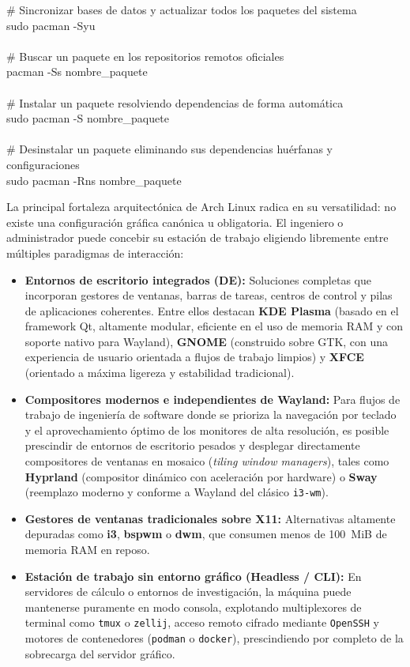 \documentclass[12pt]{article}
\begin{document}
\begin{mdframed}[style=terminal]
\ttfamily\upshape\color{bashLetterColor}\footnotesize
\# Sincronizar bases de datos y actualizar todos los paquetes del sistema \\
sudo pacman -Syu \\
\\
\# Buscar un paquete en los repositorios remotos oficiales \\
pacman -Ss nombre\_paquete \\
\\
\# Instalar un paquete resolviendo dependencias de forma automática \\
sudo pacman -S nombre\_paquete \\
\\
\# Desinstalar un paquete eliminando sus dependencias huérfanas y configuraciones \\
sudo pacman -Rns nombre\_paquete
\end{mdframed}

La principal fortaleza arquitectónica de Arch Linux radica en su versatilidad: no existe una configuración gráfica canónica u obligatoria. El ingeniero o administrador puede concebir su estación de trabajo eligiendo libremente entre múltiples paradigmas de interacción:
\begin{itemize}[noitemsep, topsep=2pt]
    \item \textbf{Entornos de escritorio integrados (DE):} Soluciones completas que incorporan gestores de ventanas, barras de tareas, centros de control y pilas de aplicaciones coherentes. Entre ellos destacan \textbf{KDE Plasma} (basado en el framework Qt, altamente modular, eficiente en el uso de memoria RAM y con soporte nativo para Wayland), \textbf{GNOME} (construido sobre GTK, con una experiencia de usuario orientada a flujos de trabajo limpios) y \textbf{XFCE} (orientado a máxima ligereza y estabilidad tradicional).
    \item \textbf{Compositores modernos e independientes de Wayland:} Para flujos de trabajo de ingeniería de software donde se prioriza la navegación por teclado y el aprovechamiento óptimo de los monitores de alta resolución, es posible prescindir de entornos de escritorio pesados y desplegar directamente compositores de ventanas en mosaico (\textit{tiling window managers}), tales como \textbf{Hyprland} (compositor dinámico con aceleración por hardware) o \textbf{Sway} (reemplazo moderno y conforme a Wayland del clásico \texttt{i3-wm}).
    \item \textbf{Gestores de ventanas tradicionales sobre X11:} Alternativas altamente depuradas como \textbf{i3}, \textbf{bspwm} o \textbf{dwm}, que consumen menos de 100~MiB de memoria RAM en reposo.
    \item \textbf{Estación de trabajo sin entorno gráfico (Headless / CLI):} En servidores de cálculo o entornos de investigación, la máquina puede mantenerse puramente en modo consola, explotando multiplexores de terminal como \texttt{tmux} o \texttt{zellij}, acceso remoto cifrado mediante \texttt{OpenSSH} y motores de contenedores (\texttt{podman} o \texttt{docker}), prescindiendo por completo de la sobrecarga del servidor gráfico.
\end{itemize}
\end{document}
